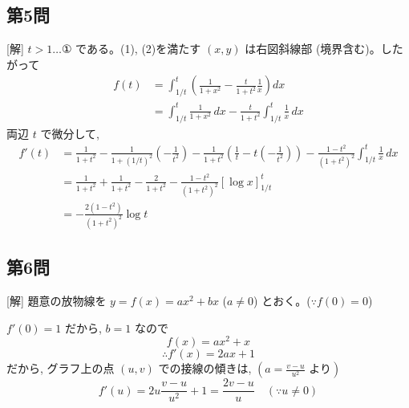 \documentclass[../main.tex]{subfiles}
\begin{document}
\subsection*{第5問}

[解] $t > 1 \dots \text{①}$ である。(1), (2)を満たす $(x,y)$ は右図斜線部 (境界含む)。したがって
\[
  \begin{aligned}
    f(t) &= \int_{1/t}^t \left( \frac{1}{1+x^2} - \frac{t}{1+t^2} \frac{1}{x} \right) dx \\
    &= \int_{1/t}^t \frac{1}{1+x^2} \, dx - \frac{t}{1+t^2} \int_{1/t}^t \frac{1}{x} \, dx
  \end{aligned}
\]
両辺 $t$ で微分して,
\[
  \begin{aligned}
    f'(t) &= \frac{1}{1+t^2} - \frac{1}{1+(1/t)^2} \left(-\frac{1}{t^2}\right) - \frac{1}{1+t^2} \left( \frac{1}{t} - t \left(-\frac{1}{t^2}\right) \right) - \frac{1-t^2}{(1+t^2)^2} \int_{1/t}^t \frac{1}{x} \, dx \\
    &= \frac{1}{1+t^2} + \frac{1}{1+t^2} - \frac{2}{1+t^2} - \frac{1-t^2}{(1+t^2)^2} [\log x]_{1/t}^t \\
    &= -\frac{2(1-t^2)}{(1+t^2)^2} \log t
  \end{aligned}
\]

\begin{center}
\end{center}

\subsection*{第6問}

[解] 題意の放物線を $y = f(x) = ax^2 + bx$ ($a \neq 0$) とおく。($\because f(0)=0$)

$f'(0) = 1$ だから, $b = 1$ なので
\[
  f(x) = ax^2 + x
\]
\[
  \therefore f'(x) = 2ax + 1
\]
だから, グラフ上の点 $(u, v)$ での接線の傾きは, $\left( a = \frac{v-u}{u^2} \text{ より} \right)$
\[
  f'(u) = 2u \frac{v-u}{u^2} + 1 = \frac{2v-u}{u} \quad (\because u \neq 0)
\]
\end{document}
